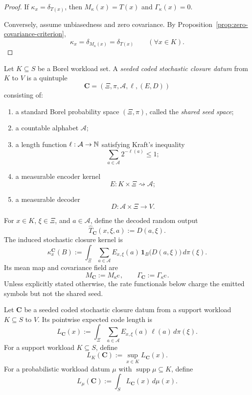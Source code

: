 \begin{proof}
If \(\kappa_x=\delta_{T(x)}\), then \(M_{\kappa}(x)=T(x)\) and
\(\Gamma_{\kappa}(x)=0\).

Conversely, assume unbiasedness and zero covariance. By
Proposition~\ref{prop:zero-covariance-criterion},
\[
\kappa_x=\delta_{M_{\kappa}(x)}=\delta_{T(x)}
\qquad (\forall x\in K).
\]
\end{proof}

\begin{definition}
\label{def:seeded-coded-stochastic-closure-datum}
Let \(K\subseteq S\) be a Borel workload set. A \emph{seeded coded stochastic
closure datum} from \(K\) to \(V\) is a quintuple
\[
\mathbf C=(\Xi,\pi,\mathcal A,\ell,(E,D))
\]
consisting of:
\begin{enumerate}[label=(\roman*), leftmargin=2em, itemsep=0.2em]
\item a standard Borel probability space \((\Xi,\pi)\), called the
      \emph{shared seed space};
\item a countable alphabet \(\mathcal A\);
\item a length function \(\ell:\mathcal A\to \mathbb{N}\) satisfying Kraft's
      inequality
      \[
      \sum_{a\in\mathcal A} 2^{-\ell(a)}\le 1;
      \]
\item a measurable encoder kernel
      \[
      E:K\times\Xi\rightsquigarrow \mathcal A;
      \]
\item a measurable decoder
      \[
      D:\mathcal A\times\Xi\to V.
      \]
\end{enumerate}
For \(x\in K\), \(\xi\in\Xi\), and \(a\in\mathcal A\), define the decoded
random output
\[
\widehat T_{\mathbf C}(x,\xi,a):=D(a,\xi).
\]
The induced stochastic closure kernel is
\[
\kappa^{\mathbf C}_x(B)
:=
\int_{\Xi}\sum_{a\in\mathcal A}
E_{x,\xi}(a)\,\mathbf 1_B\!\bigl(D(a,\xi)\bigr)\,d\pi(\xi).
\]
Its mean map and covariance field are
\[
M_{\mathbf C}:=M_{\kappa^{\mathbf C}},
\qquad
\Gamma_{\mathbf C}:=\Gamma_{\kappa^{\mathbf C}}.
\]
Unless explicitly stated otherwise, the rate functionals below charge the
emitted symbols but not the shared seed.
\end{definition}

\begin{definition}
\label{def:stochastic-rate-profiles}
Let \(\mathbf C\) be a seeded coded stochastic closure datum from a support
workload \(K\subseteq S\) to \(V\). Its pointwise expected code length is
\[
L_{\mathbf C}(x)
:=
\int_{\Xi}\sum_{a\in\mathcal A} E_{x,\xi}(a)\,\ell(a)\,d\pi(\xi).
\]
For a support workload \(K\subseteq S\), define
\[
L_K(\mathbf C):=\sup_{x\in K} L_{\mathbf C}(x).
\]
For a probabilistic workload datum \(\mu\) with
\(\operatorname{supp}\mu\subseteq K\), define
\[
L_{\mu}(\mathbf C):=\int_S L_{\mathbf C}(x)\,d\mu(x).
\]
\end{definition}

